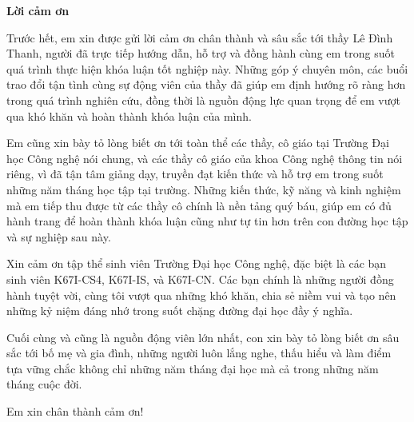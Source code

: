 \begin{center}
\textbf{\large{Lời cảm ơn}	}
\end{center}

Trước hết, em xin được gửi lời cảm ơn chân thành
và sâu sắc tới thầy Lê Đình Thanh, người đã trực tiếp
hướng dẫn, hỗ trợ và đồng hành cùng em trong suốt quá
trình thực hiện khóa luận tốt nghiệp này. Những góp ý
chuyên môn, các buổi trao đổi tận tình cùng sự động viên
của thầy đã giúp em định hướng rõ ràng hơn trong quá
trình nghiên cứu, đồng thời là nguồn động lực quan trọng
để em vượt qua khó khăn và hoàn thành khóa luận
của mình.

Em cũng xin bày tỏ lòng biết ơn tới toàn thể các
thầy, cô giáo tại Trường Đại học Công nghệ nói
chung, và các thầy cô giáo của khoa Công nghệ thông tin
nói riêng, vì đã tận tâm giảng dạy, truyền đạt
kiến thức và hỗ trợ em trong suốt những năm tháng
học tập tại trường. Những kiến thức, kỹ năng và
kinh nghiệm mà em tiếp thu được từ các thầy cô
chính là nền tảng quý báu, giúp em có đủ hành
trang để hoàn thành khóa luận cũng như tự tin
hơn trên con đường học tập và sự nghiệp sau này.

Xin cảm ơn tập thể sinh viên Trường Đại học Công nghệ,
đặc biệt là các bạn sinh viên K67I-CS4, K67I-IS, và
K67I-CN. Các bạn chính là những người đồng hành tuyệt vời,
cùng tôi vượt qua những khó khăn, chia sẻ niềm vui và
tạo nên những kỷ niệm đáng nhớ trong suốt chặng
đường đại học đầy ý nghĩa.

Cuối cùng và cũng là nguồn động viên lớn nhất, con
xin bày tỏ lòng biết ơn sâu sắc tới bố mẹ và gia đình,
những người luôn lắng nghe, thấu hiểu và làm điểm tựa
vững chắc không chỉ những năm tháng đại học mà cả
trong những năm tháng cuộc đời.

Em xin chân thành cảm ơn!
